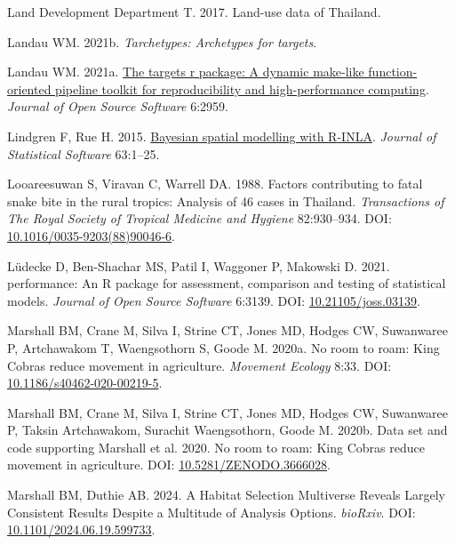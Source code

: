 \documentclass[10pt,a4paper]{article}
\newlength{\cslhangindent}
\newenvironment{CSLReferences}[2] %
 {\begin{list}{}{%
  \setlength{\itemindent}{0pt}
  \setlength{\leftmargin}{0pt}
  \setlength{\parsep}{0pt}
  \ifodd #1
   \setlength{\leftmargin}{\cslhangindent}
   \setlength{\itemindent}{-1\cslhangindent}
  \fi
  \setlength{\itemsep}{#2\baselineskip}}}
 {\end{list}}
\begin{document}
\begin{CSLReferences}{1}{0}
Land Development Department T. 2017. Land-use data of {Thailand}.

Landau WM. 2021b. \emph{Tarchetypes: Archetypes for targets}.

Landau WM. 2021a. \href{https://doi.org/10.21105/joss.02959}{The targets r package: A dynamic make-like function-oriented pipeline toolkit for reproducibility and high-performance computing}. \emph{Journal of Open Source Software} 6:2959.

Lindgren F, Rue H. 2015. \href{http://www.jstatsoft.org/v63/i19/}{Bayesian spatial modelling with {R}-{INLA}}. \emph{Journal of Statistical Software} 63:1--25.

Looareesuwan S, Viravan C, Warrell DA. 1988. Factors contributing to fatal snake bite in the rural tropics: Analysis of 46 cases in {Thailand}. \emph{Transactions of The Royal Society of Tropical Medicine and Hygiene} 82:930--934. DOI: \href{https://doi.org/10.1016/0035-9203(88)90046-6}{10.1016/0035-9203(88)90046-6}.

Lüdecke D, Ben-Shachar MS, Patil I, Waggoner P, Makowski D. 2021. {performance}: An {R} package for assessment, comparison and testing of statistical models. \emph{Journal of Open Source Software} 6:3139. DOI: \href{https://doi.org/10.21105/joss.03139}{10.21105/joss.03139}.

Marshall BM, Crane M, Silva I, Strine CT, Jones MD, Hodges CW, Suwanwaree P, Artchawakom T, Waengsothorn S, Goode M. 2020a. No room to roam: {King} {Cobras} reduce movement in agriculture. \emph{Movement Ecology} 8:33. DOI: \href{https://doi.org/10.1186/s40462-020-00219-5}{10.1186/s40462-020-00219-5}.

Marshall BM, Crane M, Silva I, Strine CT, Jones MD, Hodges CW, Suwanwaree P, Taksin Artchawakom, Surachit Waengsothorn, Goode M. 2020b. Data set and code supporting {Marshall} et al. 2020. {No} room to roam: {King} {Cobras} reduce movement in agriculture. DOI: \href{https://doi.org/10.5281/ZENODO.3666028}{10.5281/ZENODO.3666028}.

Marshall BM, Duthie AB. 2024. A {Habitat} {Selection} {Multiverse} {Reveals} {Largely} {Consistent} {Results} {Despite} a {Multitude} of {Analysis} {Options}. \emph{bioRxiv}. DOI: \href{https://doi.org/10.1101/2024.06.19.599733}{10.1101/2024.06.19.599733}.


\end{CSLReferences}
\end{document}

